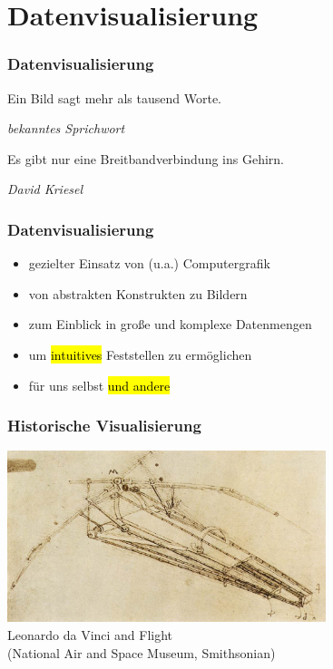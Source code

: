 

\section{Datenvisualisierung}

\begin{frame}
\frametitle{Datenvisualisierung}

\vfill

\epigraph{Ein Bild sagt mehr als tausend Worte.}{\textit{bekanntes Sprichwort}}

\vfill

\epigraph{Es gibt nur eine Breitbandverbindung ins Gehirn.}{\textit{David Kriesel}}

\vfill
\end{frame}


\begin{frame}
\frametitle{Datenvisualisierung}

\begin{itemize}
	\item gezielter Einsatz von (u.a.) Computergrafik
	\item von abstrakten Konstrukten zu Bildern
	\item zum Einblick in große und komplexe Datenmengen
	\item um \hl{intuitives} Feststellen zu ermöglichen
	\item für uns selbst \hl{und andere}
\end{itemize}
\end{frame}


\begin{frame}
\frametitle{Historische Visualisierung}

\vfill
\begin{center}
	\includegraphics[height=50mm]{fig5/historical-davinci.jpg} \\
	\scriptsize Leonardo da Vinci and Flight \\
	\tiny (National Air and Space Museum, Smithsonian)
\end{center}
\vfill
\end{frame}


